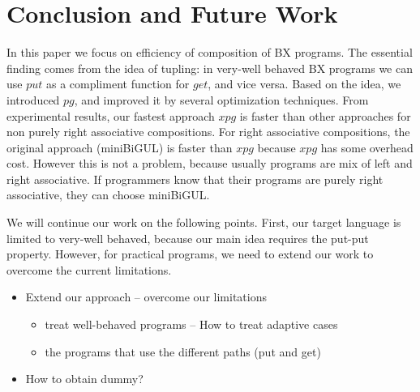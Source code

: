 \section{Conclusion and Future Work}

In this paper we focus on efficiency of composition of BX programs.
The essential finding comes from the idea of tupling: in very-well behaved BX programs we can use $put$ as a compliment function for $get$, and vice versa.
Based on the idea, we introduced $pg$, and improved it by several optimization techniques. From experimental results, our fastest approach $xpg$ is faster than other approaches for non purely right associative compositions. For right associative compositions, the original approach (miniBiGUL) is faster than $xpg$ because $xpg$ has some overhead cost. However this is not a problem, because usually programs are mix of left and right associative. If programmers know that their programs are purely right associative, they can choose miniBiGUL.

We will continue our work on the following points. First, our target language is limited to very-well behaved, because our main idea requires the put-put property. However, for practical programs, we need to extend our work to overcome the current limitations.

\begin{itemize}
\item Extend our approach -- overcome our limitations
  \begin{itemize}
  \item treat well-behaved programs -- How to treat adaptive cases
  \item the programs that use the different paths (put and get)
  \end{itemize}
\item How to obtain dummy?
\end{itemize}
